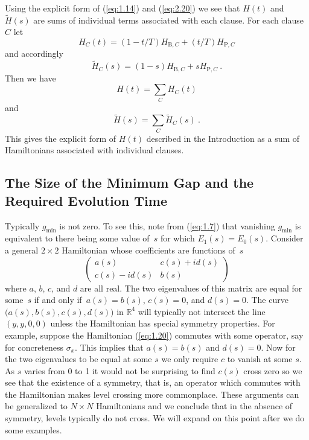 \documentclass[twoside]{article}
\newcommand{\numEq}[2]{\begin{equation}
   \label{eq:#1}
   #2\end{equation}}
\newcommand{\refEq}[1]{(\ref{eq:#1})}
\newcommand{\rP}{{\mathrm{P}}}
\newcommand{\rB}{{\mathrm{B}}}
\newcommand{\gm}{g_{\min}}
\newcommand{\ifff}{if and only if}
\let\tilde\widetilde
\numberwithin{equation}{section}
\begin{document}
Using the explicit form of \refEq{1.14} and \refEq{2.20} we see that $H(t)$
and $\tilde H(s)$ are sums of individual terms associated with each clause.
For each clause $C$ let
\numEq{2.25}{ H_C(t) = (1-t/T) H_{\rB, C} + (t/T) H_{\rP, C} } and
accordingly
\numEq{2.26}{
\tilde H_C(s) = (1-s) H_{\rB, C} + s H_{\rP, C}\ . } Then we have 
\numEq{2.27}{ H(t) = \sum_C H_C(t) } and 
\numEq{2.28}{
\tilde H(s) = \sum_C \tilde H_C(s)\ . } This gives the explicit form of $H(t)$ 
described in the Introduction  as a sum of Hamiltonians associated with
individual clauses. 

\subsection{The Size of the Minimum Gap and the\\
 Required Evolution Time} Typically $\gm$ is not zero. To see this, note
from \refEq{1.7} that vanishing $\gm$ is equivalent to there being some
value of~$s$ for which
$E_1(s) = E_0(s)$. Consider a general $2\times 2$ Hamiltonian whose
coefficients are functions of~$s$
\numEq{1.20}{
\begin{pmatrix} a(s) & c(s) + i d(s)\\ c(s) - i d(s) & b(s)
\end{pmatrix} } where $a$, $b$, $c$, and $d$ are all real. The two
eigenvalues of this matrix are equal  for some~$s$ \ifff\  $a(s)=b(s)$,  
$c(s)=0$, and $d(s)=0$. The curve $\bigl( a(s),b(s),c(s),d(s)\bigr)$ in
$\mathbb{R}^4$ will typically not intersect the line $(y,y,0,0)$ unless the
Hamiltonian has special symmetry properties.  For example, suppose the
Hamiltonian \refEq{1.20} commutes with some operator, say for
concreteness $\sigma_x$.  This implies that
$a(s)=b(s)$ and $d(s)=0$.  Now for the two eigenvalues to be equal at some
$s$ we only require $c$ to vanish at some $s$.  As $s$ varies from 0 to 1 it
would not be surprising to find $c(s)$ cross zero so we see that the
existence of a symmetry, that is, an operator which commutes with the
Hamiltonian makes level crossing more commonplace.  These arguments can
be generalized to
$N\times N$ Hamiltonians and we conclude that in the absence of
symmetry, levels  typically do not cross.  We will expand on this point
after we do some examples. 
\end{document}
